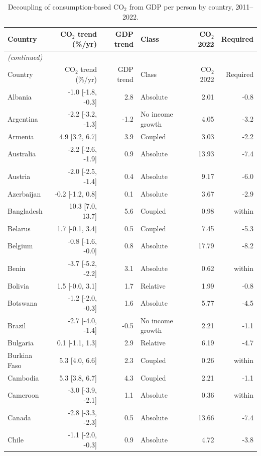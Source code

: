 \begingroup
\footnotesize
\setlength{\tabcolsep}{4pt}
\begin{longtable}{@{}lrrlrr@{}}
\caption{Decoupling of consumption-based CO$_2$ from GDP per person by country, 2011--2022.}\label{tab:deccountries}\\
\toprule
Country & CO$_2$ trend (\%/yr) & GDP trend & Class & CO$_2$ 2022 & Required \\
\midrule
\endfirsthead
\multicolumn{6}{l}{\textit{(continued)}}\\
\toprule
Country & CO$_2$ trend (\%/yr) & GDP trend & Class & CO$_2$ 2022 & Required \\
\midrule
\endhead
\bottomrule
\endfoot
\bottomrule
\endlastfoot
Albania & -1.0 [-1.8, -0.3] & 2.8 & Absolute & 2.01 & -0.8 \\
Argentina & -2.2 [-3.2, -1.3] & -1.2 & No income growth & 4.05 & -3.2 \\
Armenia & 4.9 [3.2, 6.7] & 3.9 & Coupled & 3.03 & -2.2 \\
Australia & -2.2 [-2.6, -1.9] & 0.9 & Absolute & 13.93 & -7.4 \\
Austria & -2.0 [-2.5, -1.4] & 0.4 & Absolute & 9.17 & -6.0 \\
Azerbaijan & -0.2 [-1.2, 0.8] & 0.1 & Absolute & 3.67 & -2.9 \\
Bangladesh & 10.3 [7.0, 13.7] & 5.6 & Coupled & 0.98 & within \\
Belarus & 1.7 [-0.1, 3.4] & 0.5 & Coupled & 7.45 & -5.3 \\
Belgium & -0.8 [-1.6, -0.0] & 0.8 & Absolute & 17.79 & -8.2 \\
Benin & -3.7 [-5.2, -2.2] & 3.1 & Absolute & 0.62 & within \\
Bolivia & 1.5 [-0.0, 3.1] & 1.7 & Relative & 1.99 & -0.8 \\
Botswana & -1.2 [-2.0, -0.3] & 1.6 & Absolute & 5.77 & -4.5 \\
Brazil & -2.7 [-4.0, -1.4] & -0.5 & No income growth & 2.21 & -1.1 \\
Bulgaria & 0.1 [-1.1, 1.3] & 2.9 & Relative & 6.19 & -4.7 \\
Burkina Faso & 5.3 [4.0, 6.6] & 2.3 & Coupled & 0.26 & within \\
Cambodia & 5.3 [3.8, 6.7] & 4.3 & Coupled & 2.21 & -1.1 \\
Cameroon & -3.0 [-3.9, -2.1] & 1.1 & Absolute & 0.36 & within \\
Canada & -2.8 [-3.3, -2.3] & 0.5 & Absolute & 13.66 & -7.4 \\
Chile & -1.1 [-2.0, -0.3] & 0.9 & Absolute & 4.72 & -3.8 \\

\end{longtable}
